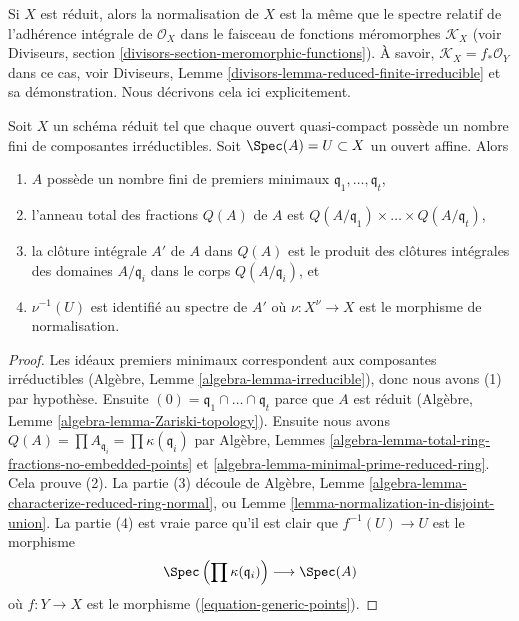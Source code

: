 \noindent
Si $X$ est réduit, alors la normalisation de
$X$ est la même que le spectre relatif de l'adhérence
intégrale de $\mathcal{O}_X$ dans le faisceau
de fonctions méromorphes $\mathcal{K}_X$ (voir Diviseurs, section
\ref{divisors-section-meromorphic-functions}). À savoir, $\mathcal{K}_X = f_*\mathcal{O}_Y$ dans ce cas,
voir Diviseurs, Lemme \ref{divisors-lemma-reduced-finite-irreducible} et sa démonstration.
Nous décrivons cela ici explicitement.

\begin{lemma}
\label{lemma-description-normalization}
Soit $X$ un schéma réduit tel que chaque ouvert quasi-compact
possède un nombre fini de composantes irréductibles. Soit $\Spec(A) = U \subset X$
un ouvert affine. Alors
\begin{enumerate}
\item $A$ possède un nombre fini
de premiers minimaux $\mathfrak q_1, \ldots, \mathfrak q_t$,
\item l'anneau total des fractions
$Q(A)$ de $A$ est $Q(A/\mathfrak q_1) \times \ldots \times Q(A/\mathfrak q_t)$,
\item la clôture intégrale $A'$ de $A$ dans $Q(A)$
est le produit des clôtures intégrales des domaines $A/\mathfrak q_i$
dans le corps $Q(A/\mathfrak q_i)$, et
\item $\nu^{-1}(U)$ est identifié au spectre de $A'$ où $\nu : X^\nu \to X$
est le morphisme de normalisation.
\end{enumerate}
\end{lemma}

\begin{proof}
Les idéaux premiers minimaux correspondent
aux composantes irréductibles
(Algèbre, Lemme
\ref{algebra-lemma-irreducible}), donc nous avons (1) par hypothèse.
Ensuite $(0) = \mathfrak q_1 \cap \ldots \cap \mathfrak q_t$ parce que
$A$
est réduit (Algèbre, Lemme \ref{algebra-lemma-Zariski-topology}).
Ensuite nous avons $Q(A) = \prod A_{\mathfrak q_i} = \prod \kappa(\mathfrak q_i)$ par Algèbre,
Lemmes \ref{algebra-lemma-total-ring-fractions-no-embedded-points} et \ref{algebra-lemma-minimal-prime-reduced-ring}.
Cela prouve (2).
La partie (3) découle de Algèbre, Lemme \ref{algebra-lemma-characterize-reduced-ring-normal},
ou Lemme \ref{lemma-normalization-in-disjoint-union}.
La partie (4) est vraie parce qu'il est clair que $f^{-1}(U) \to U$ est le morphisme
$$
\Spec\left(\prod \kappa(\mathfrak q_i)\right)
\longrightarrow
\Spec(A)
$$
où $f : Y \to X$ est le morphisme (\ref{equation-generic-points}).
\end{proof}

